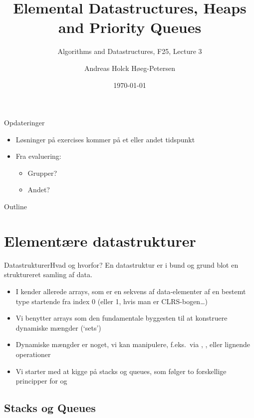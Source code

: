 \documentclass[aspectratio=1610]{beamer}
\title[ALG25 - Lecture 4]
{Elemental Datastructures, Heaps and Priority Queues}
\subtitle
{Algorithms and Datastructures, F25, Lecture 3}
\author[Andreas H. Høeg-Petersen]
{Andreas Holck Høeg-Petersen}
\institute[AAU]{%
  Department of Computer Science\\
  Aalborg University
}
\date {\today}
\begin{document}
\begin{frame}
  \titlepage
\end{frame}

\begin{frame}{Opdateringer}{}
    \begin{itemize}
        \item Løsninger på exercises kommer på et eller andet tidspunkt
        \item Fra evaluering:
            \begin{itemize}
                \item Grupper?
                \item Andet?
            \end{itemize}
    \end{itemize}
\end{frame}


\begin{frame}{Outline}
  \tableofcontents
\end{frame}


\section{Elementære datastrukturer}


\begin{frame}{Datastrukturer}{Hvad og hvorfor?}
    En datastruktur er i bund og grund blot en \alert{struktureret} samling af
    \alert{data}. \pause

    \begin{itemize}[<+->]
        \item I kender allerede \alert{arrays}, som er en sekvens af
            data-elementer af en bestemt type startende fra index 0 (eller 1,
            hvis man er CLRS-bogen\ldots)
        \item Vi benytter arrays som den fundamentale byggesten til at
            konstruere \alert{dynamiske mængder} (`sets')
        \item Dynamiske mængder er noget, vi kan manipulere, f.eks.\ via
            , ,  eller lignende
            operationer
        \item Vi starter med at kigge på \alert{stacks} og \alert{queues}, som
            følger to forskellige principper for  og 
    \end{itemize}
\end{frame}

\subsection{Stacks og Queues}
\end{document}
